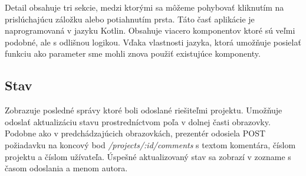 Detail obsahuje tri sekcie, medzi ktorými sa môžeme pohybovať kliknutím na prislúchajúcu záložku alebo potiahnutím prsta. Táto časť aplikácie je naprogramovaná v jazyku Kotlin. Obsahuje viacero komponentov ktoré sú veľmi podobné, ale s odlišnou logikou. Vďaka vlastnosti jazyka, ktorá umožňuje posielať funkciu ako parameter sme mohli znova použiť existujúce komponenty.

\subsection{Stav}

Zobrazuje posledné správy ktoré boli odoslané riešiteľmi projektu. Umožňuje odoslať aktualizáciu stavu prostredníctvom poľa v dolnej časti obrazovky. Podobne ako v predchádzajúcich obrazovkách, prezentér odosiela POST požiadavku na koncový bod  \textit{/projects/:id/comments} s textom komentára, číslom projektu a číslom užívateľa. Úspešné aktualizovaný stav sa zobrazí v zozname s časom odoslania a menom autora.

